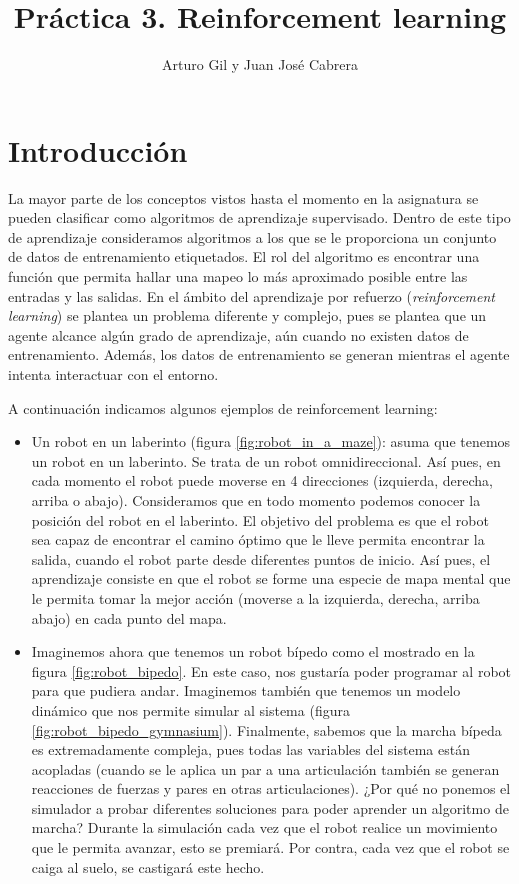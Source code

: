 \documentclass{article}
\title{Práctica 3. Reinforcement learning}
\author{Arturo Gil y Juan José Cabrera}
\begin{document}
\maketitle

\section{Introducción}
La mayor parte de los conceptos vistos hasta el momento en la asignatura se pueden clasificar como algoritmos de aprendizaje supervisado. Dentro de este tipo de aprendizaje consideramos algoritmos a los que se le proporciona un conjunto de datos de entrenamiento etiquetados. El rol del algoritmo es encontrar una función que permita hallar una mapeo lo más aproximado posible entre las entradas y las salidas. En el ámbito del aprendizaje por refuerzo (\emph{reinforcement learning}) se plantea un problema diferente y complejo, pues se plantea que un agente alcance algún grado de aprendizaje, aún cuando no existen datos de entrenamiento. Además, los datos de entrenamiento se generan mientras el agente intenta interactuar con el entorno.

A continuación indicamos algunos ejemplos de reinforcement learning:
\begin{itemize}
    \item Un robot en un laberinto (figura \ref{fig:robot_in_a_maze}): asuma que tenemos un robot en un laberinto. Se trata de un robot omnidireccional. Así pues, en cada momento el robot puede moverse en 4 direcciones (izquierda, derecha, arriba o abajo). Consideramos que en todo momento podemos conocer la posición del robot en el laberinto. El objetivo del problema es que el robot sea capaz de encontrar el camino óptimo que le lleve permita encontrar la salida, cuando el robot parte desde diferentes puntos de inicio. Así pues, el aprendizaje consiste en que el robot se forme una especie de mapa mental que le permita tomar la mejor acción (moverse a la izquierda, derecha, arriba abajo) en cada punto del mapa.
    \item Imaginemos ahora que tenemos un robot bípedo como el mostrado en la figura \ref{fig:robot_bipedo}. En este caso, nos gustaría poder programar al robot para que pudiera andar. Imaginemos también que tenemos un modelo dinámico que nos permite simular al sistema (figura \ref{fig:robot_bipedo_gymnasium}). Finalmente, sabemos que la marcha bípeda es extremadamente compleja, pues todas las variables del sistema están acopladas (cuando se le aplica un par a una articulación también se generan reacciones de fuerzas y pares en otras articulaciones). ¿Por qué no ponemos el simulador a probar diferentes soluciones para poder aprender un algoritmo de marcha? Durante la simulación cada vez que el robot realice un movimiento que le permita avanzar, esto se premiará. Por contra, cada vez que el robot se caiga al suelo, se castigará este hecho.
\end{itemize}
\end{document}
